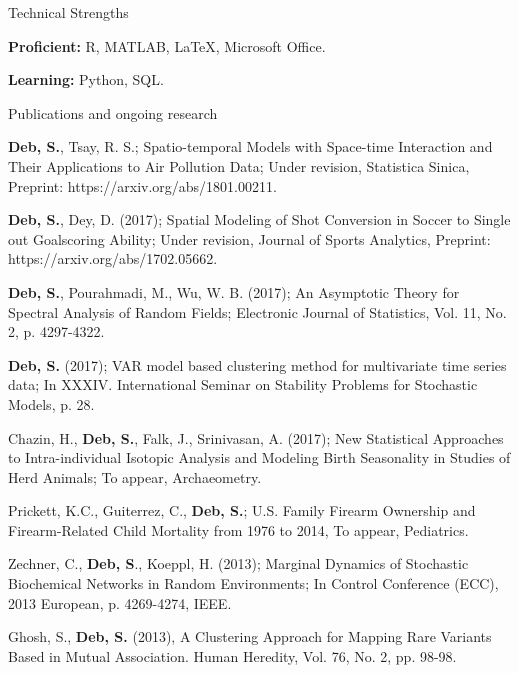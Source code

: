 \documentclass{resume} %
\begin{document}
\begin{rSection}{Technical Strengths}
\begin{rSubsection}{}{}{}{}
\item {\bf Proficient:} R, MATLAB, \LaTeX, Microsoft Office.
\item {\bf Learning:} Python, SQL.
\end{rSubsection}
\end{rSection}



\begin{rSection}{Publications and ongoing research}
\begin{rSubsection}{}{}{}{}
    \item {\bf Deb, S.}, Tsay, R. S.; Spatio-temporal Models with Space-time Interaction and Their Applications to Air Pollution Data; Under revision, Statistica Sinica, Preprint: https://arxiv.org/abs/1801.00211.
    \item {\bf Deb, S.}, Dey, D. (2017); Spatial Modeling of Shot Conversion in Soccer to Single out Goalscoring Ability; Under revision, Journal of Sports Analytics, Preprint: https://arxiv.org/abs/1702.05662.
    \item {\bf Deb, S.}, Pourahmadi, M., Wu, W. B. (2017); An Asymptotic Theory for Spectral Analysis of Random Fields;  Electronic Journal of Statistics, Vol. 11, No. 2, p. 4297-4322.
    \item {\bf Deb, S.} (2017); VAR model based clustering method for multivariate time series data; In XXXIV. International Seminar on Stability Problems for Stochastic Models, p. 28.
    \item Chazin, H., {\bf Deb, S.}, Falk, J., Srinivasan, A. (2017); New Statistical Approaches to Intra-individual Isotopic Analysis and Modeling Birth Seasonality in Studies of Herd Animals; {To appear}, Archaeometry.
     \item Prickett, K.C., Guiterrez, C., {\bf Deb, S.}; U.S. Family Firearm Ownership and Firearm-Related Child Mortality from 1976 to 2014, To appear, Pediatrics.
    \item Zechner, C., {\bf Deb, S}., Koeppl, H. (2013); Marginal Dynamics of Stochastic Biochemical Networks in Random Environments; In Control Conference (ECC), 2013 European, p. 4269-4274, IEEE.
    \item Ghosh, S., {\bf Deb, S.} (2013), A Clustering Approach for Mapping Rare Variants Based in Mutual Association. Human Heredity, Vol. 76, No. 2, pp. 98-98. 
\end{rSubsection}
\end{rSection}
\end{document}
